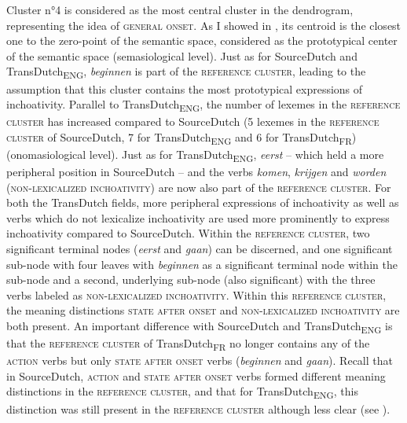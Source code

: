 Cluster n°4 is considered as the most central cluster in the dendrogram, representing the idea of \textsc{general onset}. As I showed in , its centroid is the closest one to the zero-point of the semantic space, considered as the prototypical center of the semantic space (semasiological level). Just as for SourceDutch and TransDutch\textsubscript{ENG}, \textit{beginnen} is part of the \textsc{reference cluster}, leading to the assumption that this cluster contains the most prototypical expressions of inchoativity. Parallel to TransDutch\textsubscript{ENG}, the number of lexemes in the \textsc{reference cluster} has increased compared to SourceDutch (5 lexemes in the \textsc{reference cluster} of SourceDutch, 7 for TransDutch\textsubscript{ENG} and 6 for TransDutch\textsubscript{FR}) (onomasiological level). Just as for TransDutch\textsubscript{ENG}, \textit{eerst} – which held a more peripheral position in SourceDutch – and the verbs \textit{komen}, \textit{krijgen} and \textit{worden} ({\textsc{non-lexicalized inchoativity}}) are now also part of the \textsc{reference cluster}. For both the TransDutch fields, more peripheral expressions of inchoativity as well as verbs which do not lexicalize inchoativity are used more prominently to express inchoativity compared to SourceDutch. Within the \textsc{reference cluster}, two significant terminal nodes (\textit{eerst} and \textit{gaan}) can be discerned, and one significant sub-node with four leaves with \textit{beginnen} as a significant terminal node within the sub-node and a second, underlying sub-node (also significant) with the three verbs labeled as {\textsc{non-lexicalized inchoativity}}. Within this \textsc{reference cluster}, the meaning distinctions \textsc{state after onset} and {\textsc{non-lexicalized inchoativity}} are both present. An important difference with SourceDutch and TransDutch\textsubscript{ENG} is that the \textsc{reference cluster} of TransDutch\textsubscript{FR} no longer contains any of the \textsc{action} verbs but only \textsc{state after onset} verbs (\textit{beginnen} and \textit{gaan}). Recall that in SourceDutch, \textsc{action} and \textsc{state after onset} verbs formed different meaning distinctions in the \textsc{reference cluster}, and that for TransDutch\textsubscript{ENG}, this distinction was still present in the \textsc{reference cluster} although less clear (see ).

